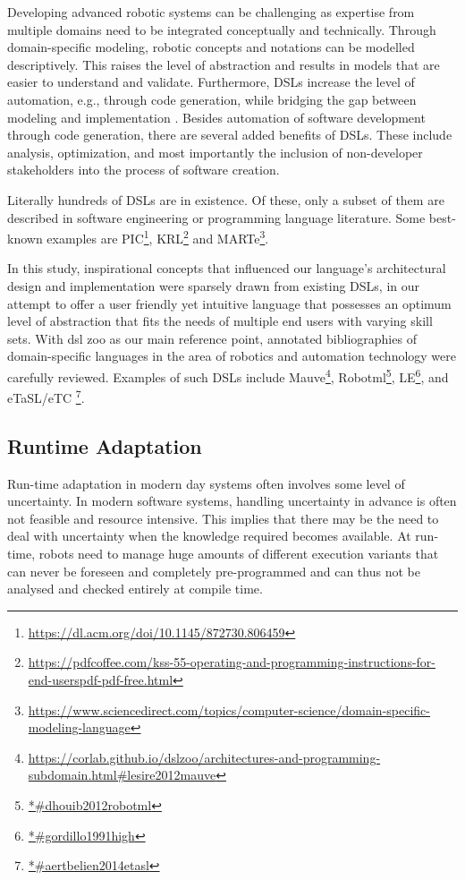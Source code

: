 \documentclass[conference]{IEEEtran}
\newcommand{\foot}[1]{\footnote{\url{#1}}}
\begin{document}
Developing advanced robotic systems can be challenging as expertise from multiple domains need to be integrated conceptually and technically. Through domain-speciﬁc modeling, robotic concepts and notations can be modelled descriptively. This raises the level of abstraction and results in models that are easier to understand and validate. Furthermore, DSLs increase the level of automation, e.g., through code generation, while bridging the gap between modeling and implementation \cite{dsl-robo}. Besides automation of software development through code generation, there are several added benefits of DSLs. These include analysis, optimization, and most importantly the inclusion of non-developer stakeholders into the process of software creation.

Literally hundreds of DSLs are in existence. Of these, only a subset of them are described in software engineering or programming language literature. Some best-known examples are PIC\foot{https://dl.acm.org/doi/10.1145/872730.806459}, KRL\foot{https://pdfcoffee.com/kss-55-operating-and-programming-instructions-for-end-userspdf-pdf-free.html} and MARTe\foot{https://www.sciencedirect.com/topics/computer-science/domain-specific-modeling-language}.

In this study, inspirational concepts that influenced our language's architectural design and implementation were sparsely drawn from existing DSLs, in our attempt to offer a user friendly yet intuitive language that possesses an optimum level of abstraction that fits the needs of multiple end users with varying skill sets. With dsl zoo \cite{dsl-robo} as our main reference point, annotated bibliographies of domain-specific languages in the area of robotics and automation technology were carefully reviewed. Examples of such DSLs include Mauve\foot{https://corlab.github.io/dslzoo/architectures-and-programming-subdomain.html#lesire2012mauve}, Robotml\foot{*#dhouib2012robotml}, LE\foot{*#gordillo1991high}, and eTaSL/eTC \foot{*#aertbelien2014etasl}.

\subsection{Runtime Adaptation}
Run-time adaptation in modern day systems often involves some level of uncertainty. In modern software systems, handling uncertainty in advance is often not feasible and resource intensive. This implies that there may be the need to deal with uncertainty when the knowledge required becomes available. At run-time, robots need to manage huge amounts of different execution variants that can never be foreseen and completely pre-programmed and can thus not be analysed and checked entirely at compile time.
\end{document}
